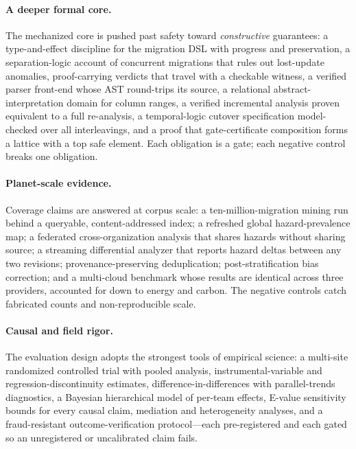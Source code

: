 \documentclass[11pt]{article}
\begin{document}
\paragraph{A deeper formal core.}
The mechanized core is pushed past safety toward \emph{constructive} guarantees: a type-and-effect
discipline for the migration DSL with progress and preservation, a separation-logic account of
concurrent migrations that rules out lost-update anomalies, proof-carrying verdicts that travel with a
checkable witness, a verified parser front-end whose AST round-trips its source, a relational
abstract-interpretation domain for column ranges, a verified incremental analysis proven equivalent to
a full re-analysis, a temporal-logic cutover specification model-checked over all interleavings, and a
proof that gate-certificate composition forms a lattice with a top safe element. Each obligation is a
gate; each negative control breaks one obligation.

\paragraph{Planet-scale evidence.}
Coverage claims are answered at corpus scale: a ten-million-migration mining run behind a queryable,
content-addressed index; a refreshed global hazard-prevalence map; a federated cross-organization
analysis that shares hazards without sharing source; a streaming differential analyzer that reports
hazard deltas between any two revisions; provenance-preserving deduplication; post-stratification
bias correction; and a multi-cloud benchmark whose results are identical across three providers,
accounted for down to energy and carbon. The negative controls catch fabricated counts and
non-reproducible scale.

\paragraph{Causal and field rigor.}
The evaluation design adopts the strongest tools of empirical science: a multi-site randomized
controlled trial with pooled analysis, instrumental-variable and regression-discontinuity estimates,
difference-in-differences with parallel-trends diagnostics, a Bayesian hierarchical model of per-team
effects, E-value sensitivity bounds for every causal claim, mediation and heterogeneity analyses, and
a fraud-resistant outcome-verification protocol---each pre-registered and each gated so an unregistered
or uncalibrated claim fails.
\end{document}
